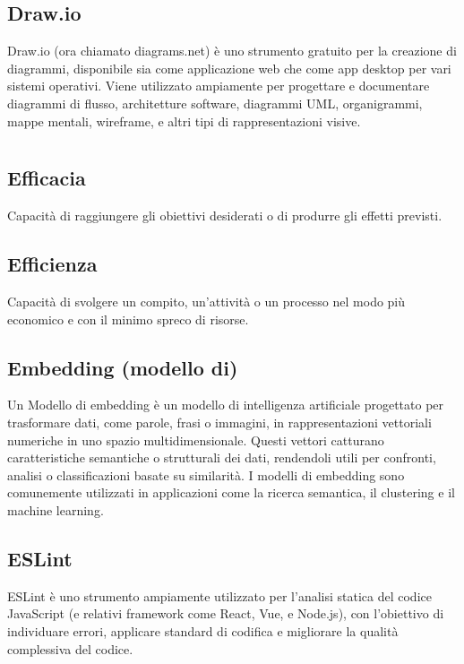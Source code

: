 \subsection*{Draw.io}
Draw.io (ora chiamato diagrams.net) è uno strumento gratuito per la creazione di diagrammi, disponibile sia come applicazione web che come app desktop per 
vari sistemi operativi. Viene utilizzato ampiamente per progettare e documentare diagrammi di flusso, architetture software, diagrammi UML, organigrammi, 
mappe mentali, wireframe, e altri tipi di rappresentazioni visive.

\newpage



\section{}

\hypertarget{sec:efficacia}{}
\subsection*{Efficacia}
Capacità di raggiungere gli obiettivi desiderati o di produrre gli effetti previsti.

\hypertarget{sec:efficienza}{}
\subsection*{Efficienza}
Capacità di svolgere un compito, un'attività o un processo nel modo più economico e con il minimo spreco di risorse.

\hypertarget{sec:embedding}{}
\subsection*{Embedding (modello di)}
Un Modello di embedding è un modello di intelligenza artificiale progettato per trasformare dati, come parole, frasi o immagini, in rappresentazioni 
vettoriali numeriche in uno spazio multidimensionale. Questi vettori catturano caratteristiche semantiche o strutturali dei dati, rendendoli utili per 
confronti, analisi o classificazioni basate su similarità. I modelli di embedding sono comunemente utilizzati in applicazioni come la ricerca semantica, 
il clustering e il machine learning.

\hypertarget{sec:eslint}{}
\subsection*{ESLint}
ESLint è uno strumento ampiamente utilizzato per l'analisi statica del codice JavaScript (e relativi framework come React, Vue, e Node.js), 
con l'obiettivo di individuare errori, applicare standard di codifica e migliorare la qualità complessiva del codice.
\newpage


